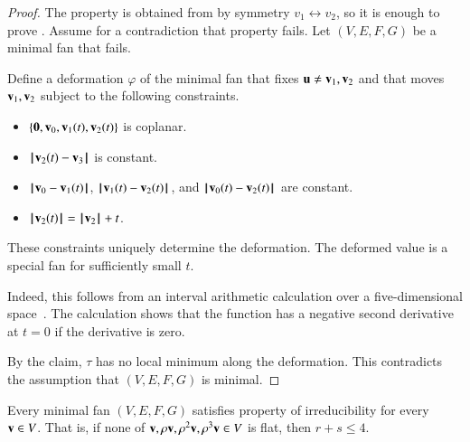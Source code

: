 \begin{proof}
The property  is obtained from  by symmetry $v_1\leftrightarrow v_2$, so it is enough to prove .  Assume for a contradiction that property  fails.
Let $(V,E,F,G)$ be a minimal fan that fails.

Define a deformation $\varphi$ of the minimal fan that fixes ${\mathbf u}\ne {\mathbf v}_1,{\mathbf v}_2$ and that moves ${\mathbf v}_1,{\mathbf v}_2$ subject to the following constraints.
\begin{itemize}
\item $\{{\mathbf 0},{\mathbf v}_0,{\mathbf v}_1(t),{\mathbf v}_2(t)\}$ is coplanar.
\item ${\hskip0.1em|\hskip-0.15em|\hskip0.1em}{\mathbf v}_2(t) - {\mathbf v}_3{\hskip0.1em|\hskip-0.15em|\hskip0.1em}$ is constant.
\item ${\hskip0.1em|\hskip-0.15em|\hskip0.1em}{\mathbf v}_0 - {\mathbf v}_1(t){\hskip0.1em|\hskip-0.15em|\hskip0.1em}$, ${\hskip0.1em|\hskip-0.15em|\hskip0.1em}{\mathbf v}_1(t) - {\mathbf v}_2(t){\hskip0.1em|\hskip-0.15em|\hskip0.1em}$, and ${\hskip0.1em|\hskip-0.15em|\hskip0.1em}{\mathbf v}_0(t) - {\mathbf v}_2(t){\hskip0.1em|\hskip-0.15em|\hskip0.1em}$ are constant.
\item ${{\hskip0.1em|\hskip-0.15em|\hskip0.1em}{\mathbf v}_2(t){\hskip0.1em|\hskip-0.15em|\hskip0.1em}} = {{\hskip0.1em|\hskip-0.15em|\hskip0.1em}{\mathbf v}_2{\hskip0.1em|\hskip-0.15em|\hskip0.1em}} + t$.
\end{itemize}
These constraints uniquely determine the deformation. The deformed value is a special fan for sufficiently small $t$.

Indeed, this follows from an interval arithmetic calculation over a five-dimensional space~\cite[cc:d2b]{hales:2009:nonlinear}. %
The calculation shows that the function  has a negative second derivative at $t=0$ if the derivative is zero.

By the claim,  $\tau$ has no local minimum along the deformation.  This contradicts the assumption that $(V,E,F,G)$ is minimal.
\end{proof}



\begin{lemma}
Every minimal fan $(V,E,F,G)$ satisfies property  of irreducibility for every ${\mathbf v}\in V$.
That is, if none of ${\mathbf v},\rho {\mathbf v},\rho^2 {\mathbf v},\rho^3 {\mathbf v}\in V$ is flat, then $r+s\le 4$.
\end{lemma}

